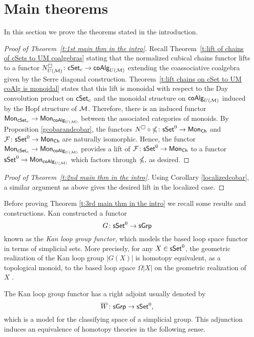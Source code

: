 
\section{Main theorems}

In this section we prove the theorems stated in the introduction. 

\begin{proof}[Proof of Theorem~\ref{t:1st main thm in the intro}]
    Recall Theorem~\ref{t:lift of chains of cSets to UM coalgebras} stating that the normalized cubical chains functor lifts to a functor $N^{\square}_{U(\mathcal{M})} \colon \mathsf{cSet}_c \to \mathsf{coAlg}_{U(\mathcal{M})}$ extending the coassociative coalgebra given by the Serre diagonal construction.
    Theorem~\ref{t:lift chains on cSet to UM coAlg is monoidal} states that this lift is  monoidal with respect to the Day convolution product on $\mathsf{cSet}_c$ and the monoidal structure on $\mathsf{coAlg}_{U(\mathcal{M})}$ induced by the Hopf structure of $\mathcal{M}$.
    Therefore, there is an induced functor $\mathsf{Mon}_{\mathsf{cSet}_c} \to \mathsf{Mon}_{\mathsf{coAlg}_{U(\mathcal{M})}}$ between the associated categories of monoids.
    By Proposition \ref{gcobarandcobar}, the functors $N^{\square} \circ \mathbb{\Omega} \colon \mathsf{sSet}^0 \to \mathsf{Mon}_{\mathsf{Ch}}$ and $\mathcal{F} \colon \mathsf{sSet}^0 \to \mathsf{Mon}_{\mathsf{Ch}}$ are naturally isomorphic.
    Hence, the functor $\mathsf{Mon}_{\mathsf{cSet}_c} \to \mathsf{Mon}_{\mathsf{coAlg}_{U(\mathcal{M})}}$ provides a lift of $\mathcal{F} \colon \mathsf{sSet}^0 \to \mathsf{Mon}_{\mathsf{Ch}}$ to a functor  $\mathsf{sSet}^0 \to \mathsf{Mon}_{\mathsf{coAlg}_{U(\mathcal{M})}}$ which factors through $\mathbb{\Omega},$ as desired.
\end{proof}

\begin{proof}[Proof of Theorem~\ref{t:2nd main thm in the intro}]
Using Corollary \ref{localizedcobar}, a similar argument as above gives the desired lift in the localized case. 
\end{proof}

Before proving Theorem \ref{t:3rd main thm in the intro} we recall some results and constructions. 
Kan constructed a functor $$G\colon \mathsf{sSet}^0 \to \mathsf{sGrp}$$ known as the \textit{Kan loop group functor}, which models the based loop space functor in terms of simplicial sets. More precisely, for any $X \in \mathsf{sSet}^0$, the geometric realization of the Kan loop group $|G(X)|$ is homotopy equivalent, as a topological monoid, to the based loop space $\Omega|X|$ on the geometric realization of $X$ \cite{Berger}. 


The Kan loop group functor has a right adjoint usually denoted by 
$$\overline{W} \colon \mathsf{sGrp} \to \mathsf{sSet}^0,$$ which is a model for the classifying space of a simplicial group. This adjunction induces an equivalence of homotopy theories in the following sense.

